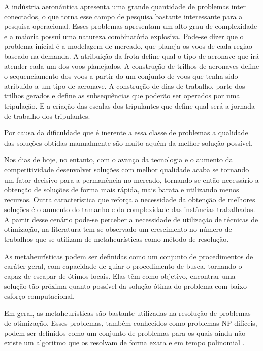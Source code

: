     A indústria aeronáutica apresenta uma grande quantidade de problemas inter conectados, o que torna esse campo de pesquisa bastante interessante para a pesquisa operacional. Esses problemas apresentam um alto grau de complexidade e a maioria possui uma natureza combinatória explosiva. Pode-se dizer que o problema inicial é a modelagem de mercado, que planeja os voos de cada regiao baseado na demanda. A atribuição da frota define qual o tipo de aeronave que irá atender cada um dos voos planejados. A construção de trilhos de aeronaves define o sequenciamento dos voos a partir do um conjunto de voos que tenha sido atribuído a um tipo de aeronave. A construção de dias de trabalho, parte dos trilhos gerados e define as subsequências que poderão ser operados por uma tripulação. E a criação das escalas dos tripulantes que define qual será a jornada de trabalho dos tripulantes.
    
    Por causa da dificuldade que é inerente a essa classe de problemas a qualidade das soluções obtidas manualmente são muito aquém da melhor solução possível. 
  
Nos dias de hoje, no entanto, com o avanço da tecnologia e o aumento da competitividade desenvolver soluções com melhor qualidade acaba se tornando um fator decisivo para a permanência no mercado, tornando-se então necessário a obtenção de soluções de forma mais rápida, mais barata e utilizando menos recursos. Outra  característica que reforça a necessidade da obtenção de melhores soluções é o aumento do tamanho e da complexidade das instâncias trabalhadas. A partir desse cenário pode-se perceber a necessidade de utilização de técnicas de otimização, na literatura tem se observado um crescimento no número de trabalhos que se utilizam de metaheurísticas como método de resolução.
  
As metaheurísticas podem ser definidas como um conjunto de procedimentos de caráter geral, com capacidade de guiar o procedimento de busca, tornando-o capaz de escapar de ótimos locais. Elas têm como objetivo, encontrar uma solução tão próxima quanto possível da solução ótima do problema com baixo esforço computacional.
  
Em geral, as metaheurísticas são bastante utilizadas na resolução de problemas de otimização. Esses problemas, também conhecidos como problemas NP-difíceis, podem ser definidos como um conjunto de problemas para os quais ainda não existe um algoritmo que os resolvam de forma exata e em tempo polinomial \citep{maritan}.
  
